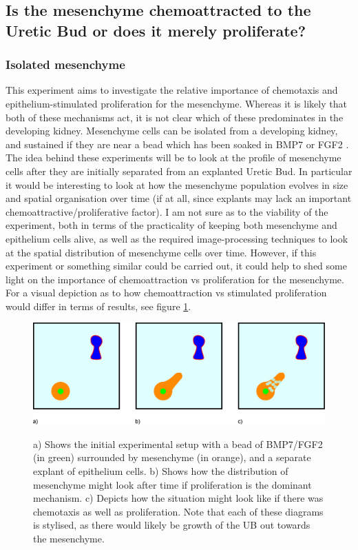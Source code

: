 \documentclass[pdftex,10pt,a4paper]{article}
\begin{document}
\subsection{Is the mesenchyme chemoattracted to the Uretic Bud or does it merely proliferate?}
\subsubsection{Isolated mesenchyme}
This experiment aims to investigate the relative importance of chemotaxis and epithelium-stimulated proliferation for the mesenchyme. Whereas it is likely that both of these mechanisms act, it is not clear which of these predominates in the developing kidney. Mesenchyme cells can be isolated from a developing kidney, and sustained if they are near a bead which has been soaked in BMP7 or FGF2 \cite{Dudley}.
The idea behind these experiments will be to look at the profile of mesenchyme cells after they are initially separated from an explanted Uretic Bud. In particular it would be interesting to look at how the mesenchyme population evolves in size and spatial organisation over time (if at all, since explants may lack an important chemoattractive/proliferative factor). I am not sure as to the viability of the experiment, both in terms of the practicality of keeping both mesenchyme and epithelium cells alive, as well as the required image-processing techniques to look at the spatial distribution of mesenchyme cells over time. However, if this experiment or something similar could be carried out, it could help to shed some light on the importance of chemoattraction vs proliferation for the mesenchyme. For a visual depiction as to how chemoattraction vs stimulated proliferation would differ in terms of results, see figure \ref{fig:messeparated}.

\begin{figure}[t] 
\centering
\scalebox{0.25} 
{\includegraphics{experiment_3.eps}}
\caption{a) Shows the initial experimental setup with a bead of BMP7/FGF2 (in green) surrounded by mesenchyme (in orange), and a separate explant of epithelium cells. b) Shows how the distribution of mesenchyme might look after time if proliferation is the dominant mechanism. c) Depicts how the situation might look like if there was chemotaxis as well as proliferation. Note that each of these diagrams is stylised, as there would likely be growth of the UB out towards the mesenchyme.} \label{fig:messeparated}
\end{figure} 
\end{document}
